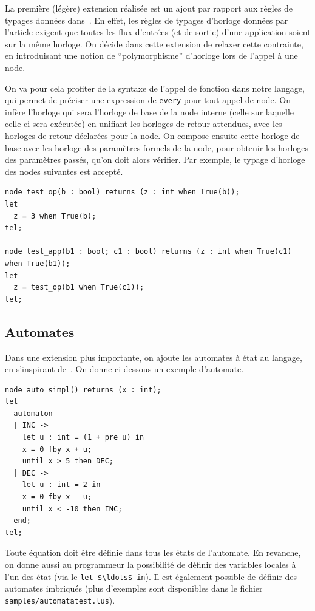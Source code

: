 \documentclass{article}
\begin{document}
La première (légère) extension réalisée est un ajout par rapport aux règles de typages données dans~\cite{Biernacki08}. En effet, les règles de typages d'horloge données par l'article exigent que toutes les flux d'entrées (et de sortie) d'une application soient sur la même horloge. On décide dans cette extension de relaxer cette contrainte, en introduisant une notion de ``polymorphisme'' d'horloge lors de l'appel à une node.

On va pour cela profiter de la syntaxe de l'appel de fonction dans notre langage, qui permet de préciser une expression de \texttt{every} pour tout appel de node. On infère l'horloge qui sera l'horloge de base de la node interne (celle sur laquelle celle-ci sera exécutée) en unifiant les horloges de retour attendues, avec les horloges de retour déclarées pour la node. On compose ensuite cette horloge de base avec les horloge des paramètres formels de la node, pour obtenir les horloges des paramètres passés, qu'on doit alors vérifier. Par exemple, le typage d'horloge des nodes suivantes est accepté.

\begin{lstlisting}
node test_op(b : bool) returns (z : int when True(b));
let
  z = 3 when True(b);
tel;

node test_app(b1 : bool; c1 : bool) returns (z : int when True(c1) when True(b1));
let
  z = test_op(b1 when True(c1));
tel;
\end{lstlisting}

\subsection{Automates}

Dans une extension plus importante, on ajoute les automates à état au langage, en s'inspirant de~\cite{Colaco05}. On donne ci-dessous un exemple d'automate.

\begin{lstlisting}
node auto_simpl() returns (x : int);
let
  automaton
  | INC ->
    let u : int = (1 + pre u) in
    x = 0 fby x + u;
    until x > 5 then DEC;
  | DEC ->
    let u : int = 2 in
    x = 0 fby x - u;
    until x < -10 then INC;
  end;
tel;
\end{lstlisting}

Toute équation doit être définie dans tous les états de l'automate. En revanche, on donne aussi au programmeur la possibilité de définir des variables locales à l'un des état (via le \lstinline[mathescape]{let $\ldots$ in}). Il est également possible de définir des automates imbriqués (plus d'exemples sont disponibles dans le fichier \texttt{samples/automatatest.lus}).
\end{document}
